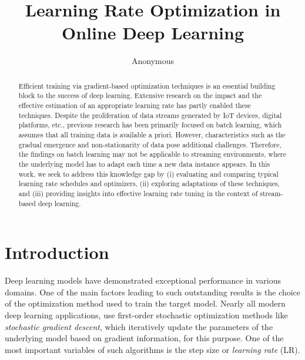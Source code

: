 \documentclass[runningheads]{llncs}
\begin{document}
%
\title{Learning Rate Optimization in Online Deep Learning}
%
%
\author{Anonymous}
%
%
%

\maketitle
%
\begin{abstract}
	Efficient training via gradient-based optimization techniques is an essential building block to the success of deep learning. Extensive research on the impact and the effective estimation of an appropriate learning rate has partly enabled these techniques. Despite the proliferation of data streams generated by IoT devices, digital platforms, etc., previous research has been primarily focused on batch learning, which assumes that all training data is available a priori. However, characteristics such as the gradual emergence and non-stationarity of data pose additional challenges. Therefore, the findings on batch learning may not be applicable to streaming environments, where the underlying model has to adapt each time a new data instance appears. In this work, we seek to address this knowledge gap by (i) evaluating and comparing typical learning rate schedules and optimizers, (ii) exploring adaptations of these techniques, and (iii) providing insights into effective learning rate tuning in the context of stream-based deep learning.

\end{abstract}
%
%
%
\section{Introduction}
Deep learning models have demonstrated exceptional performance in various domains.
One of the main factors leading to such outstanding results is the choice of the optimization method used to train the target model.
Nearly all modern deep learning applications, use first-order stochastic optimization methods like \textit{stochastic gradient descent}, which iteratively update the parameters of the underlying model based on gradient information, for this purpose.
One of the most important variables of such algorithms is the step size or \textit{learning rate} (LR).
\end{document}
